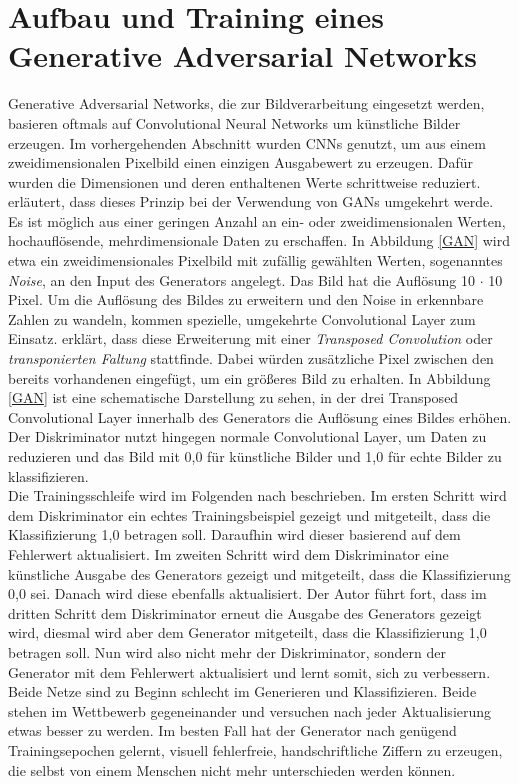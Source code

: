 \section{Aufbau und Training eines Generative Adversarial Networks}
Generative Adversarial Networks, die zur Bildverarbeitung eingesetzt werden, basieren oftmals auf Convolutional Neural Networks um künstliche Bilder erzeugen. Im vorhergehenden Abschnitt wurden CNNs genutzt, um aus einem zweidimensionalen Pixelbild einen einzigen Ausgabewert zu erzeugen. Dafür wurden die Dimensionen und deren enthaltenen Werte schrittweise reduziert. \citet[61]{tariq_gan} erläutert, dass dieses Prinzip bei der Verwendung von GANs umgekehrt werde. Es ist möglich aus einer geringen Anzahl an ein- oder zweidimensionalen Werten, hochauflösende, mehrdimensionale Daten zu erschaffen. In Abbildung \ref{GAN} wird etwa ein zweidimensionales Pixelbild mit zufällig gewählten Werten, sogenanntes \textit{Noise}, an den Input des Generators angelegt. Das Bild hat die Auflösung 10 $\cdot$ 10 Pixel. Um die Auflösung des Bildes zu erweitern und den Noise in erkennbare Zahlen zu wandeln, kommen spezielle, umgekehrte Convolutional Layer zum Einsatz. \citet[145]{tariq_gan} erklärt, dass diese Erweiterung mit einer \textit{Transposed Convolution} oder \textit{transponierten Faltung} stattfinde. Dabei würden zusätzliche Pixel zwischen den bereits vorhandenen eingefügt, um ein größeres Bild zu erhalten. In Abbildung \ref{GAN} ist eine schematische Darstellung zu sehen, in der drei Transposed Convolutional Layer innerhalb des Generators die Auflösung eines Bildes erhöhen. 
Der Diskriminator nutzt hingegen normale Convolutional Layer, um Daten zu reduzieren und das Bild mit 0,0 für künstliche Bilder und 1,0 für echte Bilder zu klassifizieren. \\

Die Trainingsschleife wird im Folgenden nach \citet[65\psq]{tariq_gan} beschrieben. Im ersten Schritt wird dem Diskriminator ein echtes Trainingsbeispiel gezeigt und mitgeteilt, dass die Klassifizierung 1,0 betragen soll. Daraufhin wird dieser basierend auf dem Fehlerwert aktualisiert. Im zweiten Schritt wird dem Diskriminator eine künstliche Ausgabe des Generators gezeigt und mitgeteilt, dass die Klassifizierung 0,0 sei. Danach wird diese ebenfalls aktualisiert. Der Autor führt fort, dass im dritten Schritt dem Diskriminator erneut die Ausgabe des Generators gezeigt wird, diesmal wird aber dem Generator mitgeteilt, dass die Klassifizierung 1,0 betragen soll. Nun wird also nicht mehr der Diskriminator, sondern der Generator mit dem Fehlerwert aktualisiert und lernt somit, sich zu verbessern. Beide Netze sind zu Beginn schlecht im Generieren und Klassifizieren. Beide stehen im Wettbewerb gegeneinander und versuchen nach jeder Aktualisierung etwas besser zu werden. Im besten Fall hat der Generator nach genügend Trainingsepochen gelernt, visuell fehlerfreie, handschriftliche Ziffern zu erzeugen, die selbst von einem Menschen nicht mehr unterschieden werden können.

